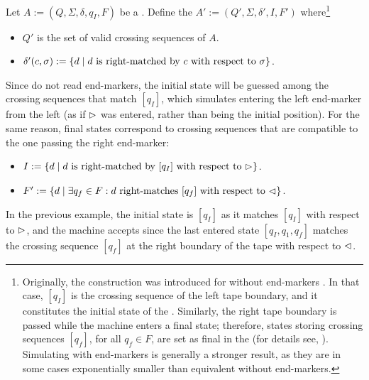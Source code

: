Let $A:=(Q,\Sigma,\delta,q_I,F)$ be a \TDFA.
Define the \ONFA $A':=(Q',\Sigma,\delta',I,F')$ where\footnote{%
	Originally, the construction was introduced for \TDFAs without end-markers \cite{RabSco59}.
	In that case, $[q_I]$ is the crossing sequence of the left tape boundary, and it constitutes the initial state of the \ONFA.
	Similarly, the right tape boundary is passed while the machine enters a final state; therefore, states storing crossing sequences $[q_f]$, for all $q_f\in F$, are set as final in the \ONFA (for details see, \eg[,] \cite{HopUll79}).
	Simulating \TDFAs with end-markers is generally a stronger result, as they are in some cases exponentially smaller than equivalent \TDFAs without end-markers.
}
\begin{itemize}
	\item $Q'$ is the set of valid crossing sequences of $A$.
	\item $\delta'(c,\sigma):=\{d \mid \text{$d$ is right-matched by $c$ with respect to~$\sigma$}\}$.
\end{itemize}
Since \ONFAs do not read end-markers, the initial state will be guessed among the crossing sequences that match $[q_I]$, which simulates entering the left end-marker from the left (as if $\rhd$ was entered, rather than being the initial position).
For the same reason, final states correspond to crossing sequences that are compatible to the one passing the right end-marker:
\begin{itemize}
	\item $I:=\{d\mid \text{$d$ is right-matched by $[q_I]$ with respect to $\rhd$}\}$.
	\item $F':=\{d\mid \exists q_f\in F: \text{$d$ right-matches $[q_f]$ with respect to $\lhd$}\}$.
\end{itemize}
In the previous example, the initial state is $[q_I]$ as it matches $[q_I]$ with respect to $\rhd$, and the machine accepts since the last entered state $[q_I,q_1,q_f]$ matches the crossing sequence $[q_f]$ at the right boundary of the tape with respect to $\lhd$.

